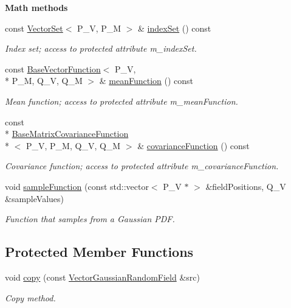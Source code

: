 \begin{Indent}{\bf Math methods}\par
\begin{DoxyCompactItemize}
\item 
const \hyperlink{class_q_u_e_s_o_1_1_vector_set}{Vector\-Set}$<$ P\-\_\-\-V, P\-\_\-\-M $>$ \& \hyperlink{class_q_u_e_s_o_1_1_vector_gaussian_random_field_a091d86faba76ed1bff60c8157a7743db}{index\-Set} () const 
\begin{DoxyCompactList}\small\item\em Index set; access to protected attribute m\-\_\-index\-Set. \end{DoxyCompactList}\item 
const \hyperlink{class_q_u_e_s_o_1_1_base_vector_function}{Base\-Vector\-Function}$<$ P\-\_\-\-V, \\*
P\-\_\-\-M, Q\-\_\-\-V, Q\-\_\-\-M $>$ \& \hyperlink{class_q_u_e_s_o_1_1_vector_gaussian_random_field_ad14336d5026583fcc31662d1790e8cf2}{mean\-Function} () const 
\begin{DoxyCompactList}\small\item\em Mean function; access to protected attribute m\-\_\-mean\-Function. \end{DoxyCompactList}\item 
const \\*
\hyperlink{class_q_u_e_s_o_1_1_base_matrix_covariance_function}{Base\-Matrix\-Covariance\-Function}\\*
$<$ P\-\_\-\-V, P\-\_\-\-M, Q\-\_\-\-V, Q\-\_\-\-M $>$ \& \hyperlink{class_q_u_e_s_o_1_1_vector_gaussian_random_field_a5c68f05266b73ad99cc52748b99febe2}{covariance\-Function} () const 
\begin{DoxyCompactList}\small\item\em Covariance function; access to protected attribute m\-\_\-covariance\-Function. \end{DoxyCompactList}\item 
void \hyperlink{class_q_u_e_s_o_1_1_vector_gaussian_random_field_a1852122a765ec7d30511ff4b3f9b5550}{sample\-Function} (const std\-::vector$<$ P\-\_\-\-V $\ast$ $>$ \&field\-Positions, Q\-\_\-\-V \&sample\-Values)
\begin{DoxyCompactList}\small\item\em Function that samples from a Gaussian P\-D\-F. \end{DoxyCompactList}\end{DoxyCompactItemize}
\end{Indent}
\subsection*{Protected Member Functions}
\begin{DoxyCompactItemize}
\item 
void \hyperlink{class_q_u_e_s_o_1_1_vector_gaussian_random_field_ab31bc63bd2e2b50cb75c6b502a69578c}{copy} (const \hyperlink{class_q_u_e_s_o_1_1_vector_gaussian_random_field}{Vector\-Gaussian\-Random\-Field} \&src)
\begin{DoxyCompactList}\small\item\em Copy method. \end{DoxyCompactList}\end{DoxyCompactItemize}
